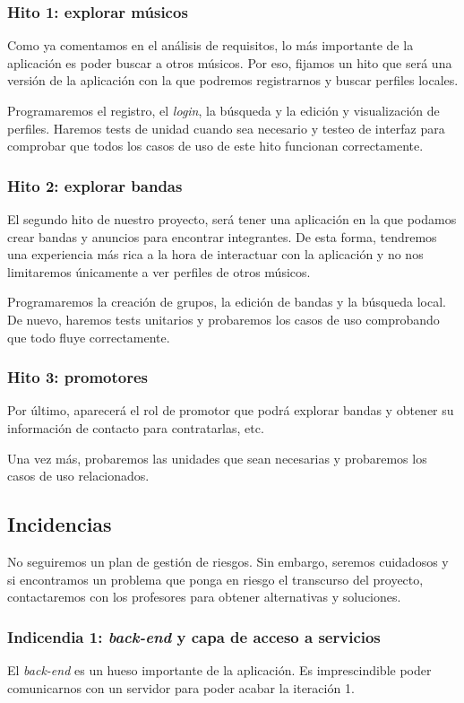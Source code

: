 \documentclass[a4paper,12pt]{article}
\begin{document}
\subsubsection{Hito 1: explorar músicos}
Como ya comentamos en el análisis de requisitos, lo más importante de la aplicación es poder buscar a otros músicos. Por eso, fijamos un hito que será una versión de la aplicación con la que podremos registrarnos y buscar perfiles locales.

Programaremos el registro, el \textit{login}, la búsqueda y la edición y visualización de perfiles. Haremos tests de unidad cuando sea necesario y testeo de interfaz para comprobar que todos los casos de uso de este hito funcionan correctamente.
\subsubsection{Hito 2: explorar bandas}
El segundo hito de nuestro proyecto, será tener una aplicación en la que podamos crear bandas y anuncios para encontrar integrantes. De esta forma, tendremos una experiencia más rica a la hora de interactuar con la aplicación y no nos limitaremos únicamente a ver perfiles de otros músicos.

Programaremos la creación de grupos, la edición de bandas y la búsqueda local. De nuevo, haremos tests unitarios y probaremos los casos de uso comprobando que todo fluye correctamente.
\subsubsection{Hito 3: promotores}
Por último, aparecerá el rol de promotor que podrá explorar bandas y obtener su información de contacto para contratarlas, etc.

Una vez más, probaremos las unidades que sean necesarias y probaremos los casos de uso relacionados.
\subsection{Incidencias}
No seguiremos un plan de gestión de riesgos. Sin embargo, seremos cuidadosos y si encontramos un problema que ponga en riesgo el transcurso del proyecto, contactaremos con los profesores para obtener alternativas y soluciones.
\subsubsection{Indicendia 1: \textit{back-end} y capa de acceso a servicios}
El \textit{back-end} es un hueso importante de la aplicación. Es imprescindible poder comunicarnos con un servidor para poder acabar la iteración 1.
\end{document}
